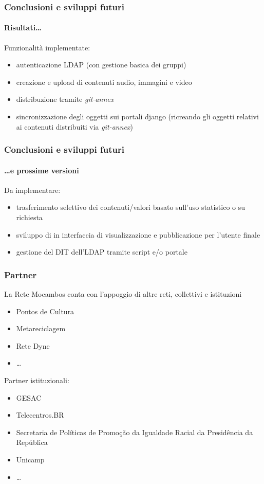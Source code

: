 \documentclass{beamer}
\begin{document}
{\begin{frame}
 \frametitle{Conclusioni e sviluppi futuri}
  \framesubtitle{Risultati\ldots}
  Funzionalità implementate:
  \begin{itemize}
  \item autenticazione LDAP (con gestione basica dei gruppi)
  \item creazione e upload di contenuti audio, immagini e video
  \item distribuzione tramite \emph{git-annex}
  \item sincronizzazione degli oggetti sui portali django (ricreando
    gli oggetti relativi ai contenuti distribuiti via
    \emph{git-annex})
  \end{itemize}
\end{frame}
  
\begin{frame}
 \frametitle{Conclusioni e sviluppi futuri}
  \framesubtitle{\ldots e prossime versioni}
 
  Da implementare:
  \begin{itemize}
  \item trasferimento selettivo dei contenuti/valori basato sull'uso
    statistico o su richiesta
  \item sviluppo di in interfaccia di visualizzazione e pubblicazione
    per l'utente finale
  \item gestione del DIT dell'LDAP tramite script e/o portale
  \end{itemize}
\end{frame}

\begin{frame}
 \frametitle{Partner}
 La Rete Mocambos conta con l'appoggio di altre reti, collettivi e istituzioni
  
  \begin{itemize}
  \item Pontos de Cultura 
  \item Metareciclagem
  \item Rete Dyne 
  \item \ldots
  \end{itemize}
  
  Partner istituzionali:
  \begin{itemize}
  \item GESAC
  \item Telecentros.BR
  \item Secretaria de Políticas de Promoção da Igualdade Racial da
    Presidência da República
  \item Unicamp 
  \item \ldots
  \end{itemize}
  

\end{frame}}
\end{document}
